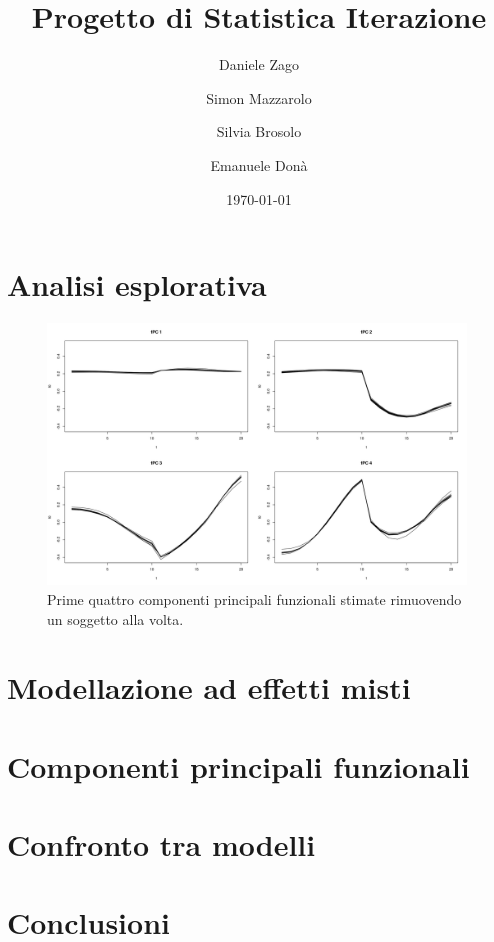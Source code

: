 \documentclass{article}
\title{Progetto di Statistica Iterazione}
\author{Daniele Zago \and Simon Mazzarolo \and Silvia Brosolo \and Emanuele Donà}
\date{\today}
\begin{document}
\maketitle

\section{Analisi esplorativa}

\begin{figure}[H]
   \centering
   \includegraphics[trim={0 0 0 0}, clip, width=0.99\textwidth]{figures/fpca_var-1.png}
   \caption{Prime quattro componenti principali funzionali stimate rimuovendo un soggetto alla volta.}
   \label{fig:fpca_var-1}
\end{figure}

\section{Modellazione ad effetti misti}

\section{Componenti principali funzionali}

\section{Confronto tra modelli}

\section{Conclusioni}


\end{document}
